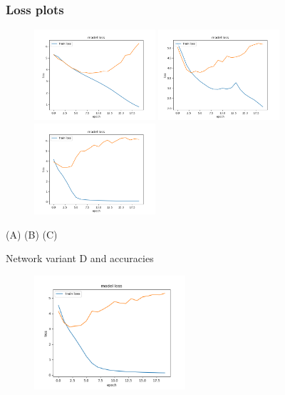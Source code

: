 \documentclass{beamer}
\begin{document}
\begin{frame}
\frametitle{Loss plots}
\centering
\begin{figure}[!h]
\centering
\begin{adjustwidth}{-.4in}{-.4in}
  \includegraphics[width=0.4\textwidth]{images/run1_loss_a.png}
  \includegraphics[width=0.4\textwidth]{images/run1_loss_b.png}
  \includegraphics[width=0.4\textwidth]{images/run1_loss_c.png}
\end{adjustwidth}
\end{figure}
(A) \hspace{3.5cm} (B) \hspace{3.5cm} (C)
\end{frame}

\begin{frame}
  \centering
  Network variant D and accuracies
  \begin{figure}[!h]
    \centering
    \includegraphics[width=0.5\textwidth]{images/run1_loss_d.png}
  \end{figure}
  
\end{frame}
\end{document}
